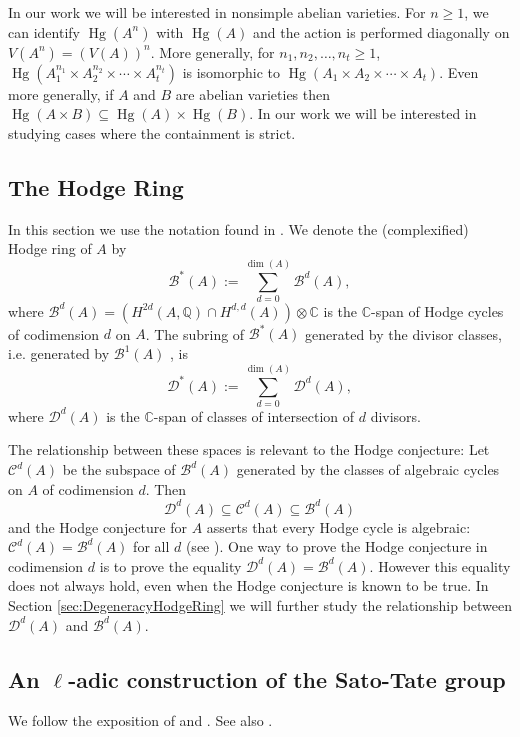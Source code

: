 \documentclass[reqno, oneside, 12pt]{amsart}
\DeclareMathOperator{\Hg}{Hg}
\theoremstyle{remark}
\numberwithin{equation}{section}
\begin{document}
In our work we will be interested in nonsimple abelian varieties. For $n\geq 1$, we can identify $\Hg(A^n)$ with $\Hg(A)$ and the action is performed diagonally on $V(A^n)=(V(A))^n$. More generally, for $n_1,n_2,\ldots, n_t\geq 1$, $\Hg(A_1^{n_1}\times A_2^{n_2}\times \cdots \times A_t^{n_t})   $ is isomorphic to $\Hg(A_1\times A_2\times \cdots \times A_t)$. Even more generally, if $A$ and $B$ are abelian varieties then $\Hg(A\times B)\subseteq \Hg(A)\times \Hg(B)$. In our work we will be interested in studying cases where the containment is strict.



\subsection{The Hodge Ring}\label{sec:backgroundHodgeRing}
In this section we use the notation found in \cite{Shioda82}.  We denote the (complexified) Hodge ring of $A$ by
$$\mathscr B^*(A):=\displaystyle\sum_{d=0}^{\dim(A)} \mathscr B^d(A), $$
where $\mathscr B^d(A)=(H^{2d}(A,\mathbb Q)\cap H^{d,d}(A))\otimes \mathbb C$ is the $\mathbb C$-span of Hodge cycles of codimension $d$ on $A$.  
The subring of $\mathscr B^*(A)$ generated by the divisor classes, i.e.  generated by $\mathscr B^1(A)$ , is
$$\mathscr D^*(A):=\displaystyle\sum_{d=0}^{\dim(A)} \mathscr D^d(A),$$ 
where $\mathscr D^d(A)$ is the $\mathbb C$-span of classes of intersection of $d$ divisors. 

The relationship between these spaces is relevant to the Hodge conjecture: Let $\mathscr C^d(A)$ be the subspace of $\mathscr B^d(A)$ generated by the classes of algebraic cycles on $A$ of codimension $d$. Then 
$$\mathscr D^d(A) \subseteq \mathscr C^d(A) \subseteq \mathscr B^d(A)$$
and the Hodge conjecture for $A$ asserts that every Hodge cycle is algebraic: $\mathscr C^d(A) = \mathscr B^d(A)$ for all $d$ (see \cite{Aoki2002, Shioda82}). One way to prove the Hodge conjecture in codimension $d$ is to prove the equality $\mathscr D^d(A) =\mathscr B^d(A)$. However this equality does not always hold, even when the Hodge conjecture is known to be true. In Section \ref{sec:DegeneracyHodgeRing} we will further study the relationship between $\mathscr D^d(A)$ and $\mathscr B^d(A)$.







\subsection{An $\ell$-adic construction of the Sato-Tate group}\label{sec:backgroundSTgroup}
We follow the exposition of \cite{EmoryGoodson2020} and \cite[Section 3.2]{SutherlandNotes}. See also \cite[Chapter 8]{SerreNXP}.
\end{document}

